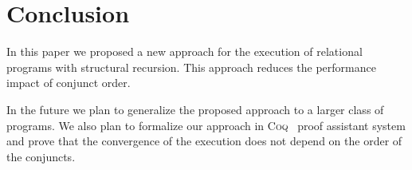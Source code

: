 \section{Conclusion}
\label{sec:conclusion}

In this paper we proposed a new approach for the execution of relational programs with structural recursion. This approach reduces the performance impact of conjunct order.

In the future we plan to generalize the proposed approach to a larger class of programs. We also plan to formalize our approach in \textsc{Coq}~\cite{fair:Coq} proof assistant
system and prove that the convergence of the execution does not depend on the order of the conjuncts.